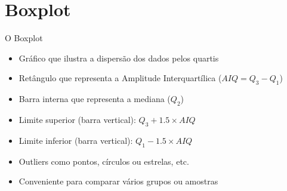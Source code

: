 \documentclass{beamer}
\begin{document}

\section{Boxplot}
\begin{frame}{O Boxplot}
  \begin{itemize}
  \item Gráfico que ilustra a dispersão dos dados pelos quartis
  \item Retângulo que representa a Amplitude Interquartílica ($AIQ =
    Q_3-Q_1$)
  \item Barra interna que representa a mediana ($Q_2$)
  \item Limite superior (barra vertical): $Q_3 + 1.5 \times AIQ$
  \item Limite inferior (barra vertical): $Q_1 - 1.5 \times AIQ$
  \item Outliers como pontos, círculos ou estrelas, etc.
  \item Conveniente para comparar vários grupos ou amostras
  \end{itemize}
\end{frame}
\end{document}
